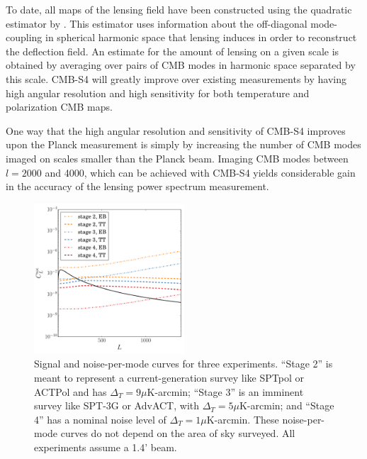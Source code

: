 To date, all maps of the lensing field have been constructed using the quadratic estimator by \cite{Hu:2001kj}.  This estimator uses information about the off-diagonal mode-coupling in spherical harmonic space that lensing induces in order to reconstruct the deflection field.  An estimate for the amount of lensing on a given scale is obtained by averaging over pairs of CMB modes in harmonic space separated by this scale. CMB-S4 will greatly improve over existing measurements by having high angular resolution and high sensitivity for both temperature and polarization CMB maps.

One way that the high angular resolution and sensitivity
of CMB-S4 improves upon the Planck measurement is simply
by increasing the number of CMB modes imaged on scales smaller than the Planck beam.  Imaging CMB modes between $l=2000$ and 4000, which can be achieved with CMB-S4 yields considerable gain in the accuracy of the lensing power spectrum measurement.

\begin{figure}[htbp]
\centering
\includegraphics[width=0.5\textwidth]{CMBLensing/n0s_s4.pdf}
\caption{Signal and noise-per-mode curves for three experiments. ``Stage 2'' is meant to represent a current-generation survey like SPTpol or ACTPol and has $\Delta_T = 9 \mu$K-arcmin; ``Stage 3'' is an imminent survey like SPT-3G or AdvACT, with $\Delta_T = 5 \mu$K-arcmin; and ``Stage 4'' has a nominal noise level of  $\Delta_T = 1 \mu$K-arcmin.   These noise-per-mode curves do not depend on the area of sky surveyed.  All experiments assume a 1.4' beam.}  
\label{n0s_s4}
\end{figure}


